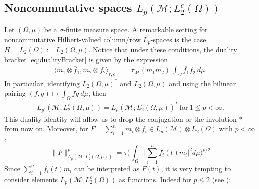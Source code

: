 \documentclass[psamsfonts]{amsart}
\newcommand{\la}{\langle}
\newcommand{\ra}{\rangle}
\newcommand{\Lp}{L_p}
\newcommand{\Ltwo}{L_2}
\newcommand{\Lpprime}{L_{p^\prime}}
\newcommand{\Ltwoc}{L_2^c}
\newcommand{\Ltwor}{L_2^r}
\begin{document}
    \subsection{Noncommutative spaces $\Lp(\mathcal{M};L^c_2(\Omega))$}

    Let $(\Omega,\mu)$ be a $\sigma$-finite measure space. A remarkable setting for noncommutative Hilbert-valued column/row $\Lp$-spaces is the case $H = \Ltwo(\Omega):= \Ltwo(\Omega,\mu)$. Notice that under these conditions, the duality bracket \eqref{eq:dualityBracket} is given by the expression
    \begin{align*}
        \la m_1 \otimes \overline f_1 ,m_2 \otimes f_2\ra_{r,c} &= \tau_{\mathcal{M}}(m_1 m_2) \ \int_{\Omega} \overline{f_1} f_2 \ d\mu.
    \end{align*}
    In particular, identifying $\Ltwo(\Omega,\mu)^*$ and $\Ltwo(\Omega,\mu)$ and using the bilinear pairing $(f,g)\mapsto \int_\Omega fg \ d\mu$, then
    \begin{align*}
        \Lpprime(\mathcal{M};\Ltwor(\Omega,\mu)) = \Lp(\mathcal{M};\Ltwoc(\Omega,\mu))^* \ \mathrm{for \ } 1 \leq p < \infty.
    \end{align*}
    This duality identity will allow us to drop the conjugation or the involution $*$ from now on. Moreover, for
    $F=\sum_{i=1}^n m_i\otimes f_i \in \Lp(\mathcal M)\otimes
    L_2(\Omega)$ with $p<\infty$:
    $$\|F\|^p_{ \Lp(\mathcal{M};\Ltwoc(\Omega,\mu))} = \tau \Big(\int_\Omega \Big|\sum_{i=1}^n f_i(t) m_i\Big|^2 d\mu \Big)^{p/2}$$
    Since $\sum_{i=1}^n f_i(t) m_i$ can be interpreted as $F(t)$, it is very tempting to consider elements $\Lp(\mathcal{M};\Ltwoc(\Omega))$ as functions. Indeed for $p\leq 2$ (see \cite[Proposition 2.5]{JLX06}):
\end{document}
